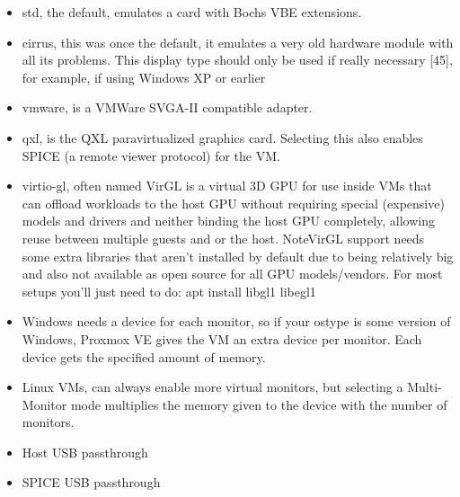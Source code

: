 \begin{itemize}[leftmargin=2cm]

	\item std, the default, emulates a card with Bochs VBE extensions.

	\item cirrus, this was once the default, it emulates a very old hardware module with all its problems. This display type should only be used if really necessary [45], for example, if using Windows XP or earlier

	\item vmware, is a VMWare SVGA-II compatible adapter.

	\item qxl, is the QXL paravirtualized graphics card. Selecting this also enables SPICE (a remote viewer protocol) for the VM.

	\item virtio-gl, often named VirGL is a virtual 3D GPU for use inside VMs that can offload workloads to the host GPU without requiring special (expensive) models and drivers and neither binding the host GPU completely, allowing reuse between multiple guests and or the host. NoteVirGL support needs some extra libraries that aren’t installed by default due to being relatively big and also not available as open source for all GPU models/vendors. For most setups you’ll just need to do: apt install libgl1 libegl1

\end{itemize}

\begin{itemize}[leftmargin=2cm]

	\item Windows needs a device for each monitor, so if your ostype is some version of Windows, Proxmox VE gives the VM an extra device per monitor. Each device gets the specified amount of memory.

	\item Linux VMs, can always enable more virtual monitors, but selecting a Multi-Monitor mode multiplies the memory given to the device with the number of monitors.

\end{itemize}

\begin{itemize}[leftmargin=2cm]

	\item Host USB passthrough

	\item SPICE USB passthrough

\end{itemize}

